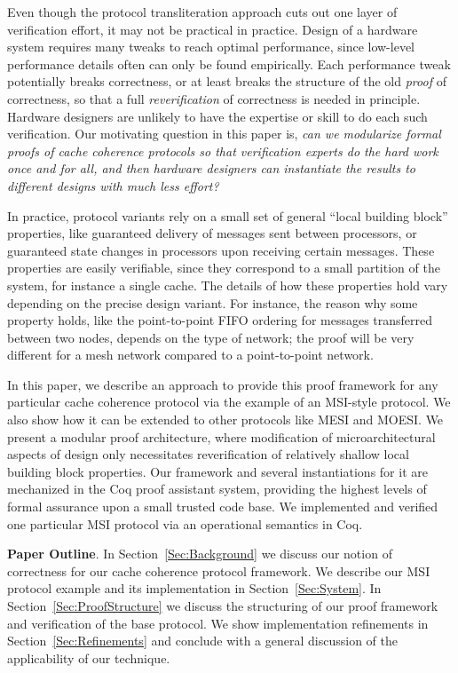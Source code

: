 Even though the protocol transliteration approach cuts out one
layer of verification effort, it may not be practical in practice.
Design of a hardware system requires many tweaks to reach
optimal performance, since low-level performance details often
can only be found empirically.  Each performance tweak potentially
breaks correctness, or at least breaks the structure of the old
\emph{proof} of correctness, so that a full \emph{reverification}
of correctness is needed in principle. Hardware designers are
unlikely to have the expertise or skill to do each such
verification.  Our motivating question in this paper is, \emph{can
we modularize formal proofs of cache coherence protocols so that
verification experts do the hard work once and for all, and then
hardware designers can instantiate the results to different designs
with much less effort?}

In practice, protocol variants rely on a small set of general ``local
building block'' properties, like guaranteed delivery of messages sent
between processors, or guaranteed state changes in processors upon
receiving certain messages.  These properties are
easily verifiable, since they correspond to a small partition of the
system, for instance a single cache.  The details of how these
properties hold vary depending on the precise design variant. For
instance, the reason why some property holds, like the point-to-point
FIFO ordering for messages transferred between two nodes, depends on
the type of network; the proof will be very different for a mesh
network compared to a point-to-point network.

In this paper, we describe an approach to provide this proof framework
for any particular cache coherence protocol via the example of an
MSI-style protocol.  We also show how it can be extended to other protocols
like MESI and MOESI.  We present a modular proof architecture,
where modification of microarchitectural
aspects of design only necessitates reverification of relatively shallow
local building block properties. Our framework and several instantiations
for it are mechanized in the Coq proof assistant system, providing the
highest levels of formal assurance upon a small trusted code base.
We implemented and verified one particular MSI protocol via an
operational semantics in Coq.

\noindent\textbf{Paper Outline}. In Section~\ref{Sec:Background} we
discuss our notion of correctness for our cache coherence protocol
framework. We describe our MSI protocol example and its implementation
in Section~\ref{Sec:System}. In Section~\ref{Sec:ProofStructure} we discuss
the structuring of our proof framework and verification of the base
protocol. We show implementation refinements in
Section~\ref{Sec:Refinements} and conclude with a general discussion
of the applicability of our technique.
